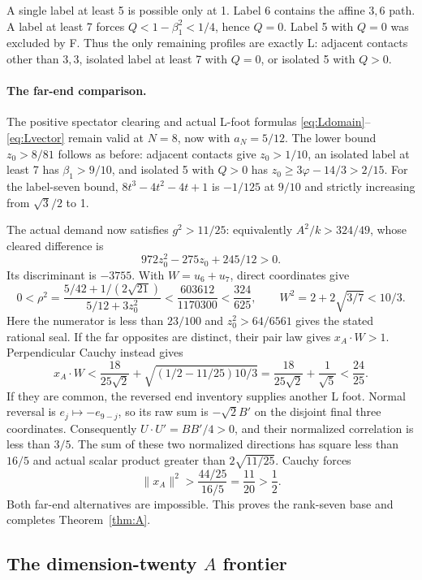 \documentclass[11pt]{article}
\theoremstyle{remark}
\newcommand{\ph}{\varphi}
\begin{document}
A single label at least 5 is possible only at 1. Label 6
contains the affine $3,6$ path. A label at least 7 forces
$Q<1-\beta_1^2<1/4$, hence $Q=0$. Label 5 with $Q=0$ was
excluded by F. Thus the only remaining profiles are exactly L:
adjacent contacts other than $3,3$, isolated label at least 7
with $Q=0$, or isolated 5 with $Q>0$.

\paragraph{The far-end comparison.}
The positive spectator clearing and actual L-foot formulas
\eqref{eq:Ldomain}--\eqref{eq:Lvector} remain valid at $N=8$,
now with $a_N=5/12$. The lower bound $z_0>8/81$ follows as
before: adjacent contacts give $z_0>1/10$, an isolated label
at least 7 has $\beta_1>9/10$, and isolated 5 with $Q>0$
has $z_0\ge3\ph-14/3>2/15$. For the label-seven bound,
$8t^3-4t^2-4t+1$ is $-1/125$ at $9/10$ and strictly
increasing from $\sqrt3/2$ to 1.

The actual demand now satisfies $g^2>11/25$: equivalently
$A^2/k>324/49$, whose cleared difference is
\[
 972z_0^2-275z_0+245/12>0.
\]
Its discriminant is $-3755$. With $W=u_6+u_7$, direct
coordinates give
\[
 0<\rho^2=
 \frac{5/42+1/(2\sqrt{21})}{5/12+3z_0^2}
 <\frac{603612}{1170300}<\frac{324}{625},
 \qquad W^2=2+2\sqrt{3/7}<10/3.
\]
Here the numerator is less than $23/100$ and
$z_0^2>64/6561$ gives the stated rational seal. If the far
opposites are distinct, their pair law gives $x_A\cdot W>1$.
Perpendicular Cauchy instead gives
\[
 x_A\cdot W<\frac{18}{25\sqrt2}
       +\sqrt{(1/2-11/25)10/3}
 =\frac{18}{25\sqrt2}+\frac1{\sqrt5}<\frac{24}{25}.
\]
If they are common, the reversed end inventory supplies another
L foot. Normal reversal is $e_j\mapsto-e_{9-j}$, so its raw
sum is $-\sqrt2B'$ on the disjoint final three coordinates.
Consequently $U\cdot U'=BB'/4>0$, and their normalized
correlation is less than $3/5$. The sum of these two normalized
directions has square less than $16/5$ and actual scalar product
greater than $2\sqrt{11/25}$. Cauchy forces
\[
 \|x_A\|^2>\frac{44/25}{16/5}=\frac{11}{20}>\frac12.
\]
Both far-end alternatives are impossible. This proves the
rank-seven base and completes Theorem~\ref{thm:A}.

\subsection{The dimension-twenty \texorpdfstring{\(A\)}{A} frontier}\label{sec:A20}
\end{document}
